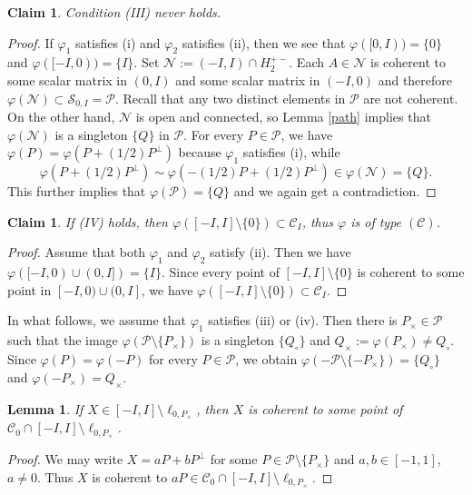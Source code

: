 \documentclass[10pt]{amsart}
\newtheorem{lemma}[theorem]{Lemma}
\newtheorem{claim}[theorem]{Claim}
\theoremstyle{definition}
\theoremstyle{remark}
\numberwithin{subsection}{section}
\numberwithin{equation}{section}
\newcommand\cC{{\mathcal{C}}}
\newcommand\cP{{\mathcal{P}}}
\begin{document}
\begin{claim}\label{(III)}
Condition (III) never holds.
\end{claim}
\begin{proof}
If $\varphi_1$ satisfies (i) and $\varphi_2$ satisfies (ii), then we see that $\varphi ([0,I)) = \{ 0 \}$ and $\varphi ([-I,0)) = \{ I \}$. Set $\mathcal{N}:=(-I,I)\cap H_2^{+-}$. Each $A \in \mathcal{N}$ is coherent to some scalar matrix in $(0,I)$ and some scalar matrix in $(-I,0)$ and therefore $\varphi (\mathcal{N}) 
\subset {\mathcal{S}}_{0, I}=\cP$. 
Recall that any two distinct elements in $\cP$ are not coherent.
On the other hand, $\mathcal{N}$ is open and connected, so Lemma \ref{path} implies that $\varphi(\mathcal{N})$ is a singleton $\{ Q \}$ in $\mathcal{P}$. For every $P \in \cP$, we have 
$\varphi (P) = \varphi (P + (1/2)P^\perp)$ because $\varphi_1$ satisfies (i), while
\[
\varphi (P + (1/2)P^\perp) \sim 
\varphi (-(1/2) P + (1/2)P^\perp) \in \varphi(\mathcal{N})=\{Q\}.
\]
This further implies that $\varphi(\cP)=\{Q\}$ and we again get a contradiction.
\end{proof}

\begin{claim}
If (IV) holds, then $\varphi([-I, I]\setminus\{0\})\subset \mathcal{C}_I$, thus $\varphi$ is of type $(\mathcal{C})$.
\end{claim}
\begin{proof}
Assume that both $\varphi_1$ and $\varphi_2$ satisfy (ii). 
Then we have $\varphi([-I, 0)\cup (0, I])=\{I\}$. 
Since every point of $[-I, I]\setminus \{0\}$ is coherent to some point in $[-I, 0)\cup (0, I]$, we have $\varphi([-I, I]\setminus\{0\})\subset \mathcal{C}_I$.
\end{proof}

In what follows, we assume that $\varphi_1$ satisfies (iii) or (iv). 
Then there is $P_\times\in \mathcal{P}$ such that the image $\varphi(\mathcal{P}\setminus \{P_\times\})$ is a singleton $\{Q_\circ\}$ and $Q_\times:=\varphi(P_\times)\neq Q_\circ$.
Since $\varphi(P)=\varphi(-P)$ for every $P\in \cP$, we obtain $\varphi(-\mathcal{P}\setminus \{-P_\times\})=\{Q_\circ\}$ and $\varphi(-P_\times)=Q_\times$.

\begin{lemma}\label{hodai}
If $X \in[-I, I]\setminus \ell_{0, P_{\times}}$, then $X$ is coherent to some point of $\cC_0\cap [-I, I]\setminus \ell_{0, P_{\times}}$.
\end{lemma}
\begin{proof}
We may write $X=aP+bP^\perp$ for some $P\in \cP\setminus\{P_\times\}$ and $a,b\in [-1,1]$, $a\neq 0$. Thus $X$ is coherent to $aP\in \cC_0\cap [-I, I]\setminus \ell_{0, P_{\times}}$.
\end{proof}
\end{document}
